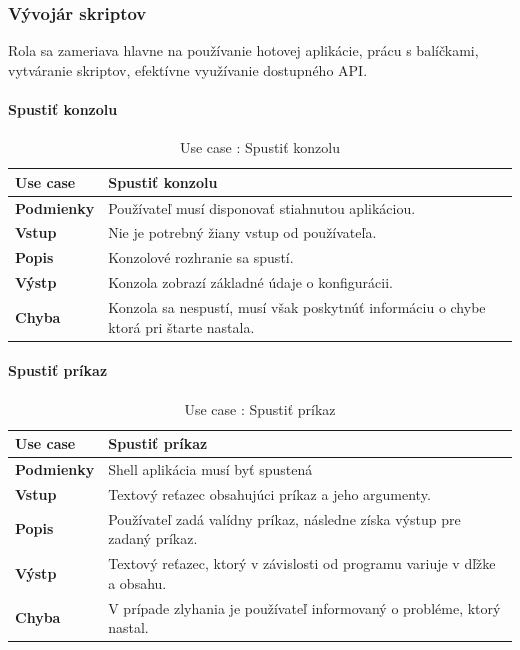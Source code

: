 \subsubsection{Vývojár skriptov}
\indent Rola sa zameriava hlavne na používanie hotovej aplikácie, prácu s balíčkami, vytváranie skriptov, efektívne využívanie dostupného API. 
\paragraph{Spustiť konzolu}
\begin{center}
	\begin{table}[htbp]
		\begin{tabular}{|p{2.5cm}|p{14cm}|}
			\hline
			\textbf{Use case} & Spustiť konzolu \\ 
			\hline
			\textbf{Podmienky} & Používateľ musí disponovať stiahnutou aplikáciou.\\
			\hline
			\textbf{Vstup} & Nie je potrebný žiany vstup od používateľa.\\
			\hline
			\textbf{Popis} & Konzolové rozhranie sa spustí. \\ 
			\hline
			\textbf{Výstp} & Konzola zobrazí základné údaje o konfigurácii.\\
			\hline
			\textbf{Chyba} & Konzola sa nespustí, musí však poskytnúť informáciu o chybe ktorá pri štarte nastala.\\
			\hline
		\end{tabular}
	\caption{Use case : Spustiť konzolu}
	\label{table:1}
	\end{table}
\end{center}
\newpage
\paragraph{Spustiť príkaz}
\begin{center}
	\begin{table}[htbp]
		\begin{tabular}{|p{2.5cm}|p{14cm}|}
		\hline
		\textbf{Use case} & Spustiť príkaz \\ 
		\hline
		\textbf{Podmienky} & Shell aplikácia musí byť spustená \\ 
		\hline
		\textbf{Vstup} & Textový reťazec obsahujúci príkaz a jeho argumenty.\\
		\hline
		\textbf{Popis} & Používateľ zadá valídny príkaz, následne získa výstup pre zadaný príkaz. \\ 
		\hline
		\textbf{Výstp} & Textový reťazec, ktorý v závislosti od programu variuje v dľžke a obsahu.\\
		\hline
		\textbf{Chyba} & V prípade zlyhania je používateľ informovaný o probléme, ktorý nastal.\\
		\hline
		\end{tabular}
	\caption{Use case : Spustiť príkaz}
	\label{table:1}
	\end{table}
\end{center}
